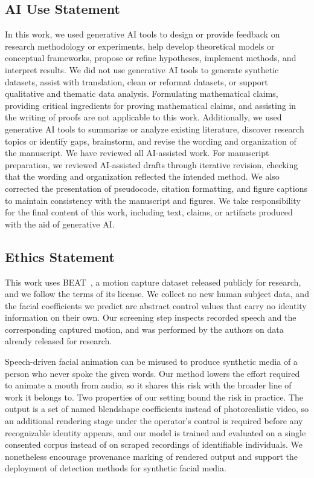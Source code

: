 \subsection*{AI Use Statement}

In this work, we used generative AI tools to design or provide feedback on research methodology or experiments, help develop theoretical models or conceptual frameworks, propose or refine hypotheses, implement methods, and interpret results.
We did not use generative AI tools to generate synthetic datasets, assist with translation, clean or reformat datasets, or support qualitative and thematic data analysis.
Formulating mathematical claims, providing critical ingredients for proving mathematical claims, and assisting in the writing of proofs are not applicable to this work.
Additionally, we used generative AI tools to summarize or analyze existing literature, discover research topics or identify gaps, brainstorm, and revise the wording and organization of the manuscript.
We have reviewed all AI-assisted work. For manuscript preparation, we reviewed AI-assisted drafts through iterative revision, checking that the wording and organization reflected the intended method. We also corrected the presentation of pseudocode, citation formatting, and figure captions to maintain consistency with the manuscript and figures. We take responsibility for the final content of this work, including text, claims, or artifacts produced with the aid of generative AI.

\subsection*{Ethics Statement}

This work uses BEAT~\citep{liu2022beat}, a motion capture dataset released publicly for research, and we follow the terms of its license. We collect no new human subject data, and the facial coefficients we predict are abstract control values that carry no identity information on their own. Our screening step inspects recorded speech and the corresponding captured motion, and was performed by the authors on data already released for research.

Speech-driven facial animation can be misused to produce synthetic media of a person who never spoke the given words. Our method lowers the effort required to animate a mouth from audio, so it shares this risk with the broader line of work it belongs to. Two properties of our setting bound the risk in practice. The output is a set of named blendshape coefficients instead of photorealistic video, so an additional rendering stage under the operator's control is required before any recognizable identity appears, and our model is trained and evaluated on a single consented corpus instead of on scraped recordings of identifiable individuals. We nonetheless encourage provenance marking of rendered output and support the deployment of detection methods for synthetic facial media.

